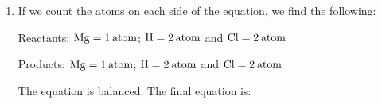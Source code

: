 {\begin{mdframed}[linewidth=4, leftmargin=40, rightmargin=40]
\begin{exercise}
\begin{enumerate}[noitemsep, label=\textbf{Step} \textbf{\arabic*}. ]
        \par 
        \item  
        \label{m38726*id63970}If we count the atoms on each side of the equation, we find the following:\par 
        \label{m38726*id63974}Reactants: \begin{math}\mathrm{Mg}=1\phantom{\rule{2pt}{0ex}}\mathrm{atom}\end{math}; \begin{math}\mathrm{H}=2\phantom{\rule{2pt}{0ex}}\mathrm{atom}\end{math} and \begin{math}\mathrm{Cl}=2\phantom{\rule{2pt}{0ex}}\mathrm{atom}\end{math}\par 
        \label{m38726*id63977}Products: \begin{math}\mathrm{Mg}=1\phantom{\rule{2pt}{0ex}}\mathrm{atom}\end{math}; \begin{math}\mathrm{H}=2\phantom{\rule{2pt}{0ex}}\mathrm{atom}\end{math} and \begin{math}\mathrm{Cl}=2\phantom{\rule{2pt}{0ex}}\mathrm{atom}\end{math}\par 
        \label{m38726*id63981}The equation is balanced. The final equation is:
        \label{m38726*id643712}\nopagebreak\noindent{} 
    

\end{enumerate}
\end{exercise}
\end{mdframed}}
